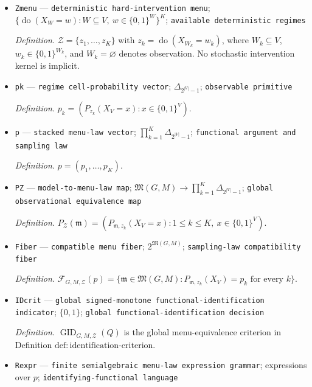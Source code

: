 \documentclass{article}
\begin{document}
\begin{itemize}
  \item \texttt{Zmenu} --- \texttt{deterministic hard-\allowbreak{}intervention menu}; \(\{\operatorname{do}(X_W=w):W\subseteq V,\ w\in\{0,1\}^{W}\}^{K}\); \texttt{available deterministic regimes}
  \par\smallskip\noindent\emph{Definition.} \(\mathcal Z=\{z_1,\ldots,z_K\}\) with \(z_k=\operatorname{do}(X_{W_k}=w_k)\), where \(W_k\subseteq V\), \(w_k\in\{0,1\}^{W_k}\), and \(W_k=\varnothing\) denotes observation. No stochastic intervention kernel is implicit.
  \item \texttt{pk} --- \texttt{regime cell-\allowbreak{}probability vector}; \(\Delta_{2^{|V|}-1}\); \texttt{observable primitive}
  \par\smallskip\noindent\emph{Definition.} \(p_k=(P_{z_k}(X_V=x):x\in\{0,1\}^{V})\).
  \item \texttt{p} --- \texttt{stacked menu-\allowbreak{}law vector}; \(\prod_{k=1}^{K}\Delta_{2^{|V|}-1}\); \texttt{functional argument and sampling law}
  \par\smallskip\noindent\emph{Definition.} \(p=(p_1,\ldots,p_K)\).
  \item \texttt{PZ} --- \texttt{model-\allowbreak{}to-\allowbreak{}menu-\allowbreak{}law map}; \(\mathfrak M(G,M)\to\prod_{k=1}^{K}\Delta_{2^{|V|}-1}\); \texttt{global observational equivalence map}
  \par\smallskip\noindent\emph{Definition.} \(P_{\mathcal Z}(\mathfrak m)=(P_{\mathfrak m,z_k}(X_V=x):1\le k\le K,\ x\in\{0,1\}^{V})\).
  \item \texttt{Fiber} --- \texttt{compatible menu fiber}; \(2^{\mathfrak M(G,M)}\); \texttt{sampling-\allowbreak{}law compatibility fiber}
  \par\smallskip\noindent\emph{Definition.} \(\mathcal F_{G,M,\mathcal Z}(p)=\{\mathfrak m\in\mathfrak M(G,M):P_{\mathfrak m,z_k}(X_V)=p_k\text{ for every }k\}\).
  \item \texttt{IDcrit} --- \texttt{global signed-\allowbreak{}monotone functional-\allowbreak{}identification indicator}; \(\{0,1\}\); \texttt{global functional-\allowbreak{}identification decision}
  \par\smallskip\noindent\emph{Definition.} \(\operatorname{GID}_{G,M,\mathcal Z}(Q)\) is the global menu-equivalence criterion in Definition \(\mathrm{def:identification\text{-}criterion}\).
  \item \texttt{Rexpr} --- \texttt{finite semialgebraic menu-\allowbreak{}law expression grammar}; expressions over \(p\); \texttt{identifying-\allowbreak{}functional language}

\end{itemize}
\end{document}
